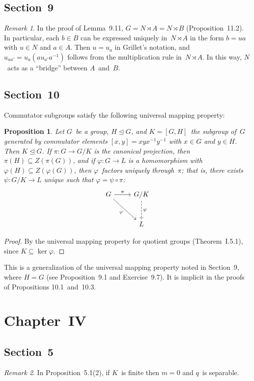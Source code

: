 \documentclass[letterpaper,12pt]{article}
\newcommand{\nsubgroupeq}{\trianglelefteq}
\newcommand{\lsemidirect}{\rtimes}
\newcommand{\after}{\circ}
\theoremstyle{definition}
\theoremstyle{remark}
\newtheorem*{rmk}{Remark}
\theoremstyle{plain}
\newtheorem*{prop}{Proposition}
\begin{document}
\subsection*{Section~9}
\begin{rmk}
In the proof of Lemma~9.11, \(G=N\lsemidirect A=N\lsemidirect B\) (Proposition~11.2). In particular, each \(b\in B\) can be expressed uniquely in~\(N\lsemidirect A\) in the form \(b=ua\) with \(u\in N\) and \(a\in A\). Then \(u=u_a\) in Grillet's notation, and \(u_{aa'}=u_a(au_{a'}a^{-1})\) follows from the multiplication rule in~\(N\lsemidirect A\). In this way, \(N\)~acts as a ``bridge'' between \(A\)~and~\(B\).
\end{rmk}

\subsection*{Section~10}
Commutator subgroups satisfy the following universal mapping property:
\begin{prop}
Let \(G\)~be a group, \(H\nsubgroupeq G\), and \(K=[G,H]\)~the subgroup of~\(G\) generated by commutator elements \([x,y]=xyx^{-1}y^{-1}\) with \(x\in G\) and \(y\in H\). Then \(K\nsubgroupeq G\). If \(\pi:G\to G/K\) is the canonical projection, then \(\pi(H)\subseteq Z(\pi(G))\), and if \(\varphi:G\to L\) is a homomorphism with \(\varphi(H)\subseteq Z(\varphi(G))\), then \(\varphi\)~factors uniquely through~\(\pi\); that is, there exists \(\psi:G/K\to L\) unique such that \(\varphi=\psi\after\pi\):
\[\begin{tikzcd}[row sep=large]
G	&G/K\\
	&L
\arrow["\pi", from=1-1, to=1-2]
\arrow["\varphi"', from=1-1, to=2-2]
\arrow["\psi", dashed, from=1-2, to=2-2]
\end{tikzcd}\]
\end{prop}
\begin{proof}
By the universal mapping property for quotient groups (Theorem~I.5.1), since \(K\subseteq\ker\varphi\).
\end{proof}
\noindent This is a generalization of the universal mapping property noted in Section~9, where \(H=G\) (see Proposition~9.1 and Exercise~9.7). It is implicit in the proofs of Propositions 10.1~and~10.3.

\section*{Chapter~IV}
\subsection*{Section~5}
\begin{rmk}
In Proposition~5.1(2), if \(K\)~is finite then \(m=0\) and \(q\)~is separable.
\end{rmk}
\end{document}
